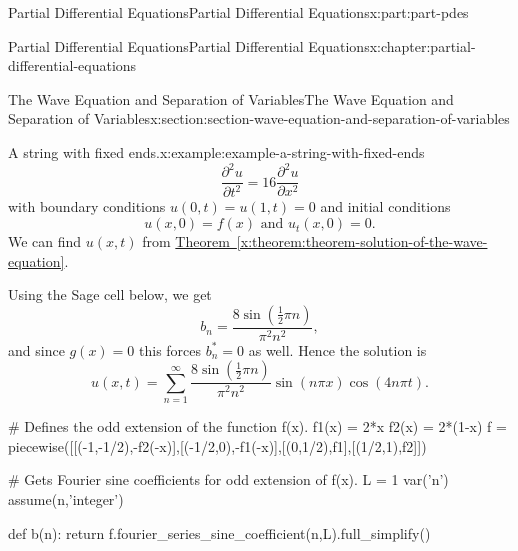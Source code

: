 \documentclass[oneside,10pt,]{book}
\newcommand{\xreffont}{\relax}
\numberwithin{equation}{part}
\newcommand{\pdv}[3][]{\dfrac{\partial^{#1} #2}{\partial #3^{#1}}}
\begin{document}
\begin{partptx}{Partial Differential Equations}{}{Partial Differential Equations}{}{}{x:part:part-pdes}
\begin{chapterptx}{Partial Differential Equations}{}{Partial Differential Equations}{}{}{x:chapter:partial-differential-equations}
\begin{sectionptx}{The Wave Equation and Separation of Variables}{}{The Wave Equation and Separation of Variables}{}{}{x:section:section-wave-equation-and-separation-of-variables}
\begin{example}{A string with fixed ends.}{x:example:example-a-string-with-fixed-ends}
\begin{equation*}
\pdv[2]{u}{t} = 16\pdv[2]{u}{x}
\end{equation*}
with boundary conditions \(u(0,t) = u(1,t) = 0\) and initial conditions%
\begin{equation*}
u(x,0) = f(x)\text{ and }u_{t}(x,0) = 0.
\end{equation*}
We can find \(u(x,t)\) from \hyperref[x:theorem:theorem-solution-of-the-wave-equation]{Theorem~{\xreffont\ref{x:theorem:theorem-solution-of-the-wave-equation}}}.%
\par
Using the Sage cell below, we get%
\begin{equation*}
b_{n} = \frac{8\sin\left(\frac{1}{2} \pi n\right)}{\pi^{2} n^{2}},
\end{equation*}
and since \(g(x) = 0\) this forces \(b^{*}_{n} = 0\) as well. Hence the solution is%
\begin{equation*}
u(x,t) = \sum_{n=1}^{\infty}\frac{8\sin\left(\frac{1}{2} \pi n\right)}{\pi^{2} n^{2}}\sin(n\pi x)\cos(4n\pi t).
\end{equation*}
%
\end{example}
\begin{sageinput}
# Defines the odd extension of the function f(x).
f1(x) = 2*x
f2(x) = 2*(1-x)
f = piecewise([[(-1,-1/2),-f2(-x)],[(-1/2,0),-f1(-x)],[(0,1/2),f1],[(1/2,1),f2]])

# Gets Fourier sine coefficients for odd extension of f(x).
L = 1
var('n')
assume(n,'integer')

def b(n):
  return f.fourier_series_sine_coefficient(n,L).full_simplify()


\end{sageinput}
\end{sectionptx}
\end{chapterptx}
\end{partptx}
\end{document}
